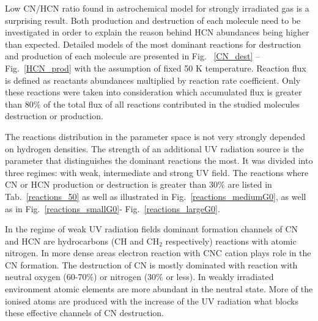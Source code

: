 \documentclass{aa}
\begin{document}

Low CN/HCN ratio found in astrochemical model for strongly irradiated gas is a surprising result.
Both production and destruction of each molecule need to be investigated in order to explain the
reason behind HCN abundances being higher than expected. Detailed models of the most dominant
reactions for destruction and production of each molecule are presented in Fig. ~\ref{CN_dest} –
Fig.~\ref{HCN_prod} with the assumption of fixed 50 K temperature. Reaction flux is defined as
reactants abundances multiplied by reaction rate coefficient. Only these reactions were taken into
consideration which accumulated flux is greater than 80$\%$ of the total flux of all reactions
contributed in the studied molecules destruction or production.

The reactions distribution in the parameter space is not very strongly depended on hydrogen
densities. The strength of an additional UV radiation source is the parameter that distinguishes the
dominant reactions the most. It was divided into three regimes: with weak, intermediate and strong
UV field. The reactions where CN or HCN production or destruction is greater than 30$\%$ are listed
in Tab.~\ref{reactions_50} as well as illustrated in Fig.~\ref{reactions_mediumG0}, as well as in Fig.~\ref{reactions_smallG0}-
Fig.~\ref{reactions_largeG0}.

In the regime of weak UV radiation fields dominant formation channels of CN and HCN are hydrocarbons
(CH and CH$_2$ respectively) reactions with atomic nitrogen. In more dense areas electron reaction
with CNC cation plays role in the CN formation. The destruction of CN is mostly dominated with
reaction with neutral oxygen (60-70$\%$) or nitrogen (30$\%$ or less). In weakly irradiated
environment atomic elements are more abundant in the neutral state. More of the ionised atoms are
produced with the increase of the UV radiation what blocks these effective channels of CN
destruction.
\end{document}
